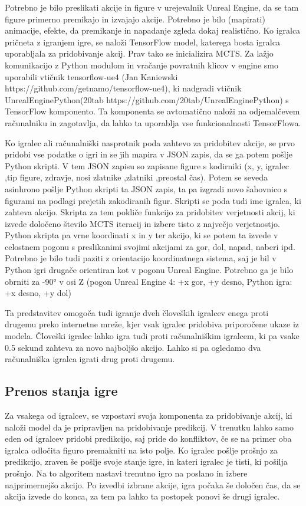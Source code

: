 \documentclass[a4paper, 12pt]{book}
\begin{document}
Potrebno je bilo preslikati akcije in figure v urejevalnik Unreal Engine, da se tam figure primerno premikajo in izvajajo akcije.
Potrebno je bilo (mapirati) animacije, efekte, da premikanje in napadanje zgleda dokaj realistično.
Ko igralca pričneta z igranjem igre, se naloži TensorFlow model, katerega bosta igralca uporabljala za pridobivanje akcij. Prav tako se inicializira MCTS.
Za lažjo komunikacijo z Python modulom in vračanje povratnih klicov v engine smo uporabili vtičnik tensorflow-ue4 (Jan Kaniewski https://github.com/getnamo/tensorflow-ue4), ki nadgradi vtičnik UnrealEnginePython(20tab https://github.com/20tab/UnrealEnginePython) s TensorFlow komponento. 
Ta komponenta se avtomatično naloži na odjemalčevem računalniku in zagotavlja, da lahko ta uporablja vse funkcionalnosti TensorFlowa.
 
Ko igralec ali računalniški nasprotnik poda zahtevo za pridobitev akcije, se prvo pridobi vse podatke o igri in se jih mapira v JSON zapis, da se ga potem pošlje Python skripti.
V tem JSON zapisu so zapisane figure s kodirniki (x, y, igralec ,tip figure, zdravje, nosi zlatnike ,zlatniki ,preostal čas).
Potem se seveda asinhrono pošlje Python skripti ta JSON zapis, ta pa izgradi novo šahovnico s figurami na podlagi prejetih zakodiranih figur.
Skripti se poda tudi ime igralca, ki zahteva akcijo.
Skripta za tem pokliče funkcijo za pridobitev verjetnosti akcij, ki izvede določeno število MCTS iteracij in izbere tisto z največjo verjetnostjo.
Python skripta pa vrne koordinati x in y ter akcijo, ki se potem ta izvede v celostnem pogonu s preslikanimi svojimi akcijami za gor, dol, napad, naberi ipd.
Potrebno je bilo tudi paziti z orientacijo koordinatnega sistema, saj je bil v Python igri drugače orientiran kot v pogonu Unreal Engine. 
Potrebno ga je bilo obrniti za -90° v osi Z (pogon Unreal Engine 4: +x gor, +y desno, Python igra: +x desno, +y dol)

Ta predstavitev omogoča tudi igranje dveh človeških igralcev enega proti drugemu preko internetne mreže, kjer vsak igralec pridobiva priporočene ukaze iz modela.
Človeški igralec lahko igra tudi proti računalniškim igralcem, ki pa vsake 0.5 sekund zahteva za novo najboljšo akcijo.
Lahko si pa ogledamo dva računalniška igralca igrati drug proti drugemu.

\subsection{Prenos stanja igre}
Za vsakega od igralcev, se vzpostavi svoja komponenta za pridobivanje akcij, ki naloži model da je pripravljen na pridobivanje predikcij.
V trenutku lahko samo eden od igralcev pridobi predikcijo, saj pride do konfliktov, če se na primer oba igralca odločita figuro premakniti na isto polje.
Ko igralec pošlje prošnjo za predikcijo, zraven še pošlje svoje stanje igre, in kateri igralec je tisti, ki pošilja prošnjo.
Na to algoritem nastavi trenutno igro na poslano in izbere najprimernejšo akcijo.
Po izvedbi izbrane akcije, igra počaka še določen čas, da se akcija izvede do konca, za tem pa lahko ta postopek ponovi še drugi igralec.
\end{document}
